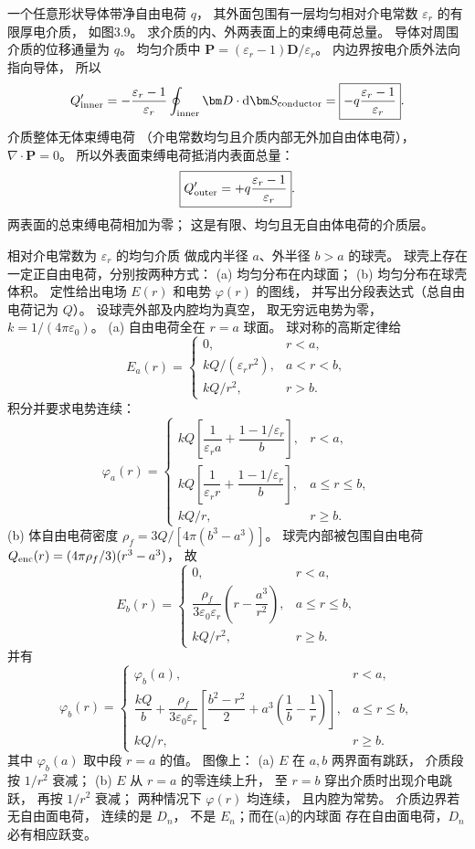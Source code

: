 一个任意形状导体带净自由电荷 $q$，
其外面包围有一层均匀相对介电常数
$\varepsilon_r$ 的有限厚电介质，
如图3.9。
求介质的内、外两表面上的束缚电荷总量。
\exsolution
导体对周围介质的位移通量为 $q$。
均匀介质中
$\bm P=(\varepsilon_r-1)\bm D/\varepsilon_r$。
内边界按电介质外法向指向导体，
所以
\[
Q'_{\rm inner}=
-\frac{\varepsilon_r-1}{\varepsilon_r}
\oint_{\rm inner}\bm D\cdot\mathrm d\bm S_{\rm conductor}
=\boxed{-q\frac{\varepsilon_r-1}{\varepsilon_r}}.
\]
介质整体无体束缚电荷
（介电常数均匀且介质内部无外加自由体电荷），
$\nabla\cdot\bm P=0$。
所以外表面束缚电荷抵消内表面总量：
\[
\boxed{Q'_{\rm outer}=
+q\frac{\varepsilon_r-1}{\varepsilon_r}}.
\]
\excheck 两表面的总束缚电荷相加为零；
这是有限、均匀且无自由体电荷的介质层。

相对介电常数为 $\varepsilon_r$ 的均匀介质
做成内半径 $a$、外半径 $b>a$ 的球壳。
球壳上存在一定正自由电荷，分别按两种方式：
(a) 均匀分布在内球面；
(b) 均匀分布在球壳体积。
定性给出电场 $E(r)$ 和电势 $\varphi(r)$ 的图线，
并写出分段表达式（总自由电荷记为 $Q$）。
\exsolution
设球壳外部及内腔均为真空，
取无穷远电势为零，
$k=1/(4\pi\varepsilon_0)$。
(a) 自由电荷全在 $r=a$ 球面。
球对称的高斯定律给
\[
\boxed{E_a(r)=
\begin{cases}
0,&r<a,\\
kQ/(\varepsilon_r r^2),&a<r<b,\\
kQ/r^2,&r>b.
\end{cases}}
\]
积分并要求电势连续：
\[
\boxed{\varphi_a(r)=
\begin{cases}
kQ\!\left[\dfrac1{\varepsilon_r a}
+\dfrac{1-1/\varepsilon_r}{b}\right],&r<a,\\
kQ\!\left[\dfrac1{\varepsilon_r r}
+\dfrac{1-1/\varepsilon_r}{b}\right],&a\le r\le b,\\
kQ/r,&r\ge b.
\end{cases}}
\]
(b) 体自由电荷密度
$\rho_f=3Q/[4\pi(b^3-a^3)]$。
球壳内部被包围自由电荷
$Q_{\rm enc}(r)=(4\pi\rho_f/3)(r^3-a^3)$，
故
\[
\boxed{E_b(r)=
\begin{cases}
0,&r<a,\\
\dfrac{\rho_f}{3\varepsilon_0\varepsilon_r}
\left(r-\dfrac{a^3}{r^2}\right),&a\le r\le b,\\
kQ/r^2,&r\ge b.
\end{cases}}
\]
并有
\[
\boxed{\varphi_b(r)=
\begin{cases}
\varphi_b(a),&r<a,\\
\dfrac{kQ}{b}+
\dfrac{\rho_f}{3\varepsilon_0\varepsilon_r}
\left[\dfrac{b^2-r^2}{2}
+a^3\left(\dfrac1b-\dfrac1r\right)\right],
&a\le r\le b,\\
kQ/r,&r\ge b.
\end{cases}}
\]
其中 $\varphi_b(a)$ 取中段 $r=a$ 的值。
图像上：
(a) $E$ 在 $a,b$ 两界面有跳跃，
介质段按 $1/r^2$ 衰减；
(b) $E$ 从 $r=a$ 的零连续上升，
至 $r=b$ 穿出介质时出现介电跳跃，
再按 $1/r^2$ 衰减；
两种情况下 $\varphi(r)$ 均连续，
且内腔为常势。
\excheck 介质边界若无自由面电荷，
连续的是 $D_n$，
不是 $E_n$；而在(a)的内球面
存在自由面电荷，$D_n$ 必有相应跃变。
